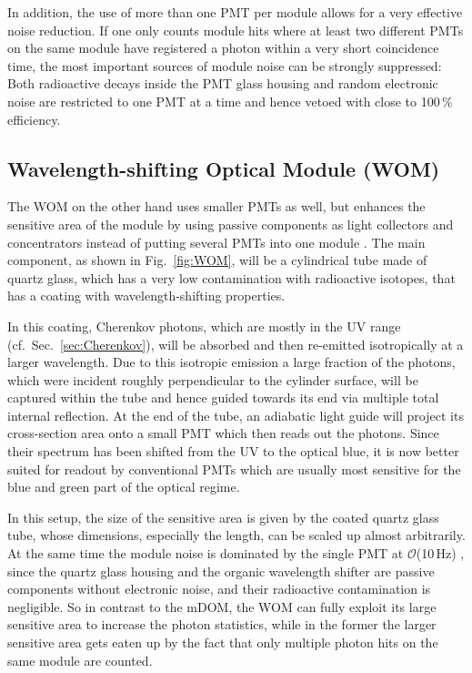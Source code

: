 In addition, the use of more than one PMT per module allows for a very
effective noise reduction. If one only counts module hits where at least two
different PMTs on the same module have registered a photon within a very short
coincidence time, the most important sources of module noise can be strongly
suppressed: Both radioactive decays inside the PMT glass housing and random
electronic noise are restricted to one PMT at a time and hence vetoed with
close to 100\,\% efficiency.

\subsection{Wavelength-shifting Optical Module (WOM)}
\label{sec:WOM}

The WOM on the other hand uses smaller PMTs as well, but enhances the sensitive
area of the module by using passive components as light collectors and
concentrators instead of putting several PMTs into one module \cite{WOM_ICRC}.
The main component, as shown in Fig.~\ref{fig:WOM}, will be a cylindrical tube
made of quartz glass, which has a very low contamination with radioactive
isotopes, that has a coating with wavelength-shifting properties.

In this coating, Cherenkov photons, which are mostly in the UV range (cf.\
Sec.~\ref{sec:Cherenkov}), will be absorbed and then re-emitted isotropically
at a larger wavelength. Due to this isotropic emission a large fraction of the
photons, which were incident roughly perpendicular to the cylinder surface,
will be captured within the tube and hence guided towards its end via multiple
total internal reflection. At the end of the tube, an adiabatic light guide
will project its cross-section area onto a small PMT which then reads out the
photons. Since their spectrum has been shifted from the UV to the optical blue,
it is now better suited for readout by conventional PMTs which are usually most
sensitive for the blue and green part of the optical regime.

In this setup, the size of the sensitive area is given by the coated quartz
glass tube, whose dimensions, especially the length, can be scaled up almost
arbitrarily. At the same time the module noise is dominated by the single PMT
at $\mathcal{O}$(10\,Hz) \cite{WOM_ICRC}, since the quartz glass housing and the
organic wavelength shifter are passive components without electronic noise, and
their radioactive contamination is negligible. So in contrast to the mDOM, the
WOM can fully exploit its large sensitive area to increase the photon
statistics, while in the former the larger sensitive area gets eaten up by the
fact that only multiple photon hits on the same module are counted.